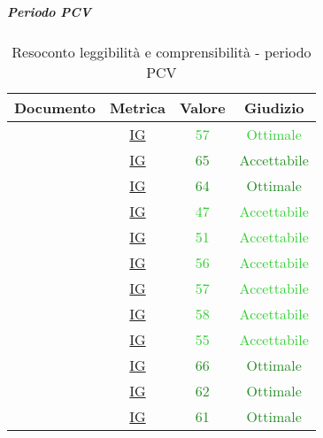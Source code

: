 							\subparagraph{Periodo PCV}
						
						\begin{table}[H]
							\centering
							\small
							\begin{tabular}{c | c | c | c}
								\hline
								\textbf{Documento} & \textbf{Metrica}    & \textbf{Valore} & \textbf{Giudizio} \\ \hline
								\pdpvtre        & \hyperref[MLEC]{IG} & \textcolor{LimeGreen}{57} & \textcolor{LimeGreen}{Ottimale} \\
								\pdqvtre        & \hyperref[MLEC]{IG} & \textcolor{ForestGreen}{65} & \textcolor{ForestGreen}{Accettabile} \\
								\ndpvtre        & \hyperref[MLEC]{IG} & \textcolor{ForestGreen}{64} & \textcolor{ForestGreen}{Ottimale} \\
								\adrvtre        & \hyperref[MLEC]{IG}  & \textcolor{LimeGreen}{47} & \textcolor{LimeGreen}{Accettabile} \\
								\stvdue		& \hyperref[MLEC]{IG}  & \textcolor{LimeGreen}{51} & \textcolor{LimeGreen}{Accettabile} \\
								\glvdue        & \hyperref[MLEC]{IG} & \textcolor{LimeGreen}{56} & \textcolor{LimeGreen}{Accettabile} \\
								\ddpvuno        & \hyperref[MLEC]{IG} & \textcolor{LimeGreen}{57} & \textcolor{LimeGreen}{Accettabile} \\
								\manutvuno        & \hyperref[MLEC]{IG} & \textcolor{LimeGreen}{58} & \textcolor{LimeGreen}{Accettabile} \\
								\manmanvuno        & \hyperref[MLEC]{IG} & \textcolor{LimeGreen}{55} & \textcolor{LimeGreen}{Accettabile} \\
								\vsesettei       & \hyperref[MLEC]{IG}& \textcolor{ForestGreen}{66} & \textcolor{ForestGreen}{Ottimale} \\
								\vottoi       & \hyperref[MLEC]{IG} &  \textcolor{ForestGreen}{62} & \textcolor{ForestGreen}{Ottimale} \\
								\vquattroe       & \hyperref[MLEC]{IG}& \textcolor{ForestGreen}{61} & \textcolor{ForestGreen}{Ottimale} \\
							\end{tabular}
							\caption{Resoconto leggibilità e comprensibilità - periodo PCV}
							\label{tab_resoconto_leggibilità_e_comprensibilità_PPCV}
						\end{table}
						
						
